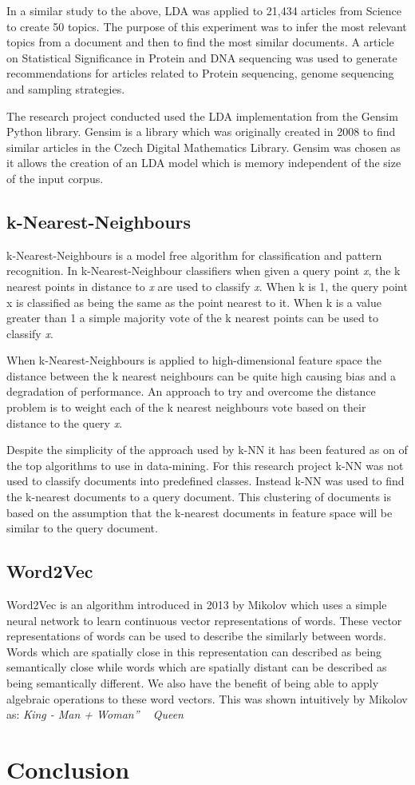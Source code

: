 In a similar study to the above, LDA was applied to 21,434 articles from Science to create 50 topics.
The purpose of this experiment was to infer the most relevant topics from a document and then to find the most similar documents.
A article on Statistical Significance in Protein and DNA sequencing was used to generate recommendations for articles related to Protein sequencing, genome sequencing and sampling strategies.

The research project conducted used the LDA implementation from the Gensim Python library.
Gensim is a library which was originally created in 2008 to find similar articles in the Czech Digital Mathematics Library.
Gensim was chosen as it allows the creation of an LDA model which is memory independent of the size of the input corpus.
\cite{rehurek_lrec}


\subsection{k-Nearest-Neighbours}
k-Nearest-Neighbours is a model free algorithm for classification and pattern recognition.
In k-Nearest-Neighbour classifiers when given a query point \textit{x}, the k nearest points in distance to \textit{x} are used to classify \textit{x}.
When k is 1, the query point x is classified as being the same as the point nearest to it.
When k is a value greater than 1 a simple majority vote of the k nearest points can be used to classify \textit{x}\cite{elementsStat}.

When k-Nearest-Neighbours is applied to high-dimensional feature space the distance between the k nearest neighbours can be quite high causing bias and a degradation of performance\cite{elementsStat}.
An approach to try and overcome the distance problem is to weight each of the k nearest neighbours vote based on their distance to the query \textit{x}\cite{top10datamining}.

Despite the simplicity of the approach used by k-NN it has been featured as on of the top algorithms to use in data-mining\cite{top10datamining}.
For this research project k-NN was not used to classify documents into predefined classes.
Instead k-NN was used to find the k-nearest documents to a query document.
This clustering of documents is based on the assumption that the k-nearest documents in feature space will be similar to the query document.

\subsection{Word2Vec}
Word2Vec is an algorithm introduced in 2013 by Mikolov which uses a simple neural network to learn continuous vector representations of words.
These vector representations of words can be used to describe the similarly between words.
Words which are spatially close in this representation can described as being semantically close while words which are spatially distant can be described as being semantically different.
We also have the benefit of being able to apply algebraic operations to these  word vectors. This was shown intuitively by Mikolov as:
\textit{King - Man + Woman” ~ Queen}

\section{Conclusion}
